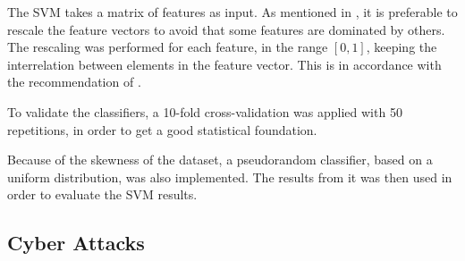 The SVM takes a matrix of features as input. As mentioned in , it is preferable to rescale the feature vectors to avoid that some features are dominated by others. The rescaling was performed for each feature, in the range $[0,1]$, keeping the interrelation between elements in the feature vector. This is in accordance with the recommendation of \citet{Hsu10apractical}.

To validate the classifiers, a 10-fold cross-validation was applied with 50 repetitions, in order to get a good statistical foundation.

Because of the skewness of the dataset, a pseudorandom classifier, based on a uniform distribution, was also implemented.  The results from it was then used in order to evaluate the SVM results. 

\subsection{Cyber Attacks}\label{cyberattacks}



\newpage 
